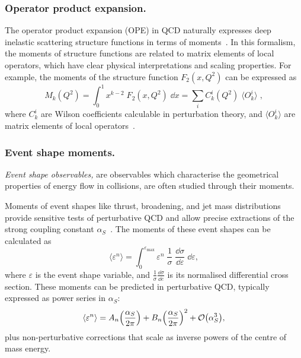         \subsubsection{Operator product expansion.}
            The operator product expansion (OPE) in QCD naturally expresses deep inelastic scattering structure functions in terms of moments~\cite{Gockeler:2006nq}.
            In this formalism, the moments of structure functions are related to matrix elements of local operators, which have clear physical interpretations and scaling properties.
            For example, the moments of the structure function $F_2(x,Q^2)$ can be expressed as
            \[
                M_k(Q^2) = \int_0^1 x^{k-2}\;F_2(x,Q^2)\;\dd x = \sum_i C_k^i(Q^2) \;\langle O_k^i \rangle\;,
            \]
            where $C_k^i$ are Wilson coefficients calculable in perturbation theory, and $\langle O_k^i \rangle$ are matrix elements of local operators~\cite{Bardeen:1978yd}.
            
        \subsubsection{Event shape moments.}
            \begin{definition}
                \emph{Event shape observables,} are observables which characterise the geometrical properties of energy flow in collisions, are often studied through their moments.
            \end{definition}
            
            Moments of event shapes like thrust, broadening, and jet mass distributions provide sensitive tests of perturbative QCD and allow precise extractions of the strong coupling constant $\alpha_S$~\cite{gehrmann_resummation_2017, Catani:1992ua}.
            The moments of these event shapes can be calculated as
            \[
                \langle \varepsilon^n \rangle = \int_0^{\varepsilon_{\text{max}}} \varepsilon^n \;\frac{1}{\sigma}\; \frac{\dd\sigma}{\dd \varepsilon}\; \dd \varepsilon,
            \]
            where $\varepsilon$ is the event shape variable, and $\frac{1}{\sigma} \frac{\dd\sigma}{\dd e}$ is its normalised differential cross section.
            These moments can be predicted in perturbative QCD, typically expressed as power series in $\alpha_S$:
            \[
                \langle \varepsilon^n \rangle = A_n \qty(\frac{\alpha_S}{2\pi}) + B_n \qty(\frac{\alpha_S}{2\pi})^2 + \mathcal{O}\qty(\alpha_S^3),
            \]
            plus non-perturbative corrections that scale as inverse powers of the centre of mass energy.
            
